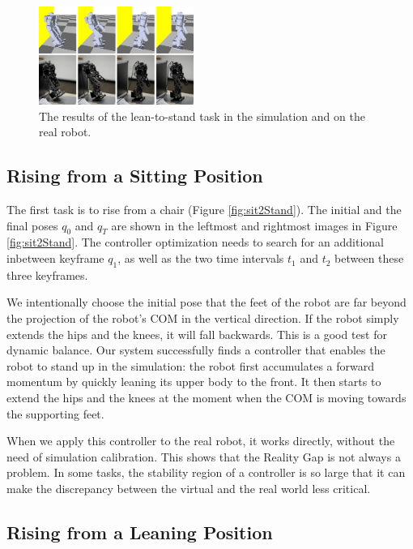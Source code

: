 \begin{figure}[!b]
  \centering
  \includegraphics[width=0.45\textwidth]{figures/lean2Stand}
  \caption{The results of the lean-to-stand task in the simulation and on the real robot.}
  \vspace{-0.1in}
  \label{fig:lean2Stand}
\end{figure}

\subsection{Rising from a Sitting Position}

The first task is to rise from a chair (Figure \ref{fig:sit2Stand}). The initial and the final poses $q_0$ and $q_T$ are shown in the leftmost and rightmost images in Figure \ref{fig:sit2Stand}. The controller optimization needs to search for an additional inbetween keyframe $q_1$, as well as the two time intervals $t_1$ and $t_2$ between these three keyframes. 

We intentionally choose the initial pose that the feet of the robot are far beyond the projection of the robot's COM in the vertical direction. If the robot simply extends the hips and the knees, it will fall backwards. This is a good test for dynamic balance. Our system successfully finds a controller that enables the robot to stand up in the simulation: the robot first accumulates a forward momentum by quickly leaning its upper body to the front. It then starts to extend the hips and the knees at the moment when the COM is moving towards the supporting feet.

When we apply this controller to the real robot, it works directly, without the need of simulation calibration. This shows that the Reality Gap is not always a problem. In some tasks, the stability region of a controller is so large that it can make the discrepancy between the virtual and the real world less critical.

\subsection{Rising from a Leaning Position}

